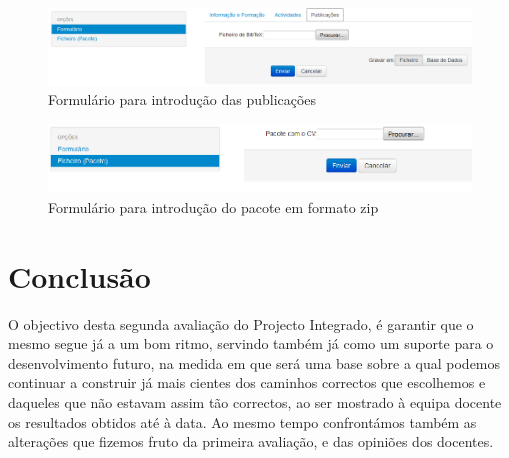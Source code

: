 \documentclass[a4paper,11pt,openright,openbib]{article}
\begin{document}
\begin{figure}[!ht]
\centering
\includegraphics[scale=0.6]{iPublications.png}
\caption{Formulário para introdução das publicações}
\label{fig:iPublications}
\end{figure}
\begin{figure}[!ht]
\centering
\includegraphics[scale=0.6]{bypacote.png}
\caption{Formulário para introdução do pacote em formato zip}
\label{fig:bypacote}
\end{figure}

\section{Conclusão}
O objectivo desta segunda avaliação do Projecto Integrado, é garantir que o mesmo segue já a um bom ritmo, servindo também já como um suporte para o desenvolvimento futuro, na medida em que será uma base sobre a qual podemos continuar a construir já mais cientes dos caminhos correctos que escolhemos e daqueles que não estavam assim tão correctos, ao ser mostrado à equipa docente os resultados obtidos até à data. Ao mesmo tempo confrontámos também as alterações que fizemos fruto da primeira avaliação, e das opiniões dos docentes.
\end{document}
